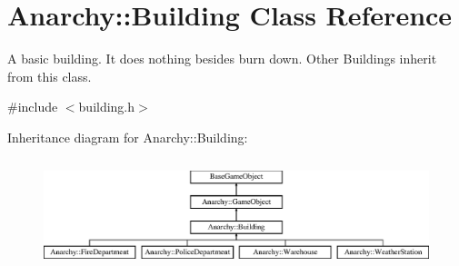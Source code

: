 \hypertarget{classAnarchy_1_1Building}{\section{Anarchy\-:\-:Building Class Reference}
\label{classAnarchy_1_1Building}
}


A basic building. It does nothing besides burn down. Other Buildings inherit from this class.  




{\ttfamily \#include $<$building.\-h$>$}

Inheritance diagram for Anarchy\-:\-:Building\-:\begin{figure}[H]
\begin{center}
\leavevmode
\includegraphics[height=3.218391cm]{classAnarchy_1_1Building}
\end{center}
\end{figure}

